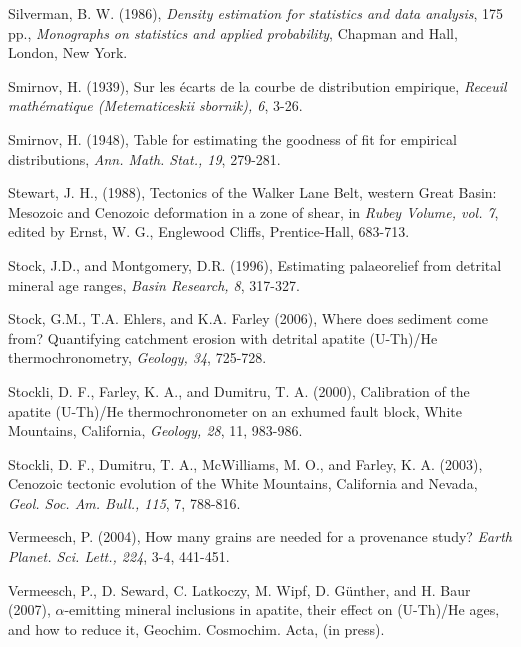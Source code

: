 \documentclass[12pt,twoside]{article}
\begin{document}
\begin{description}
\item Silverman, B. W.  (1986), {\it Density estimation for statistics
    and  data analysis}, 175  pp., {\it  Monographs on  statistics and
    applied probability}, Chapman and Hall, London, New York.
  
\item  Smirnov,  H.  (1939),  Sur  les  \'{e}carts  de  la  courbe  de
  distribution     empirique,     {\it    Receuil     math\'{e}matique
    (Metematiceskii sbornik), 6}, 3-26.
  
\item Smirnov, H. (1948), Table for estimating the goodness of fit for
  empirical distributions, {\it Ann.  Math.  Stat., 19}, 279-281.
  
\item  Stewart, J.  H., (1988),  Tectonics  of the  Walker Lane  Belt,
  western Great Basin: Mesozoic and  Cenozoic deformation in a zone of
  shear,  in {\it Rubey  Volume, vol.   7}, edited  by Ernst,  W.  G.,
  Englewood Cliffs, Prentice-Hall, 683-713.
  
\item   Stock,   J.D.,  and   Montgomery,   D.R.  (1996),   Estimating
  palaeorelief from detrital mineral  age ranges, {\it Basin Research,
    8}, 317-327.
  
\item Stock,  G.M., T.A.  Ehlers, and K.A.  Farley (2006),  Where does
  sediment  come from?   Quantifying catchment  erosion  with detrital
  apatite (U-Th)/He thermochronometry, {\it Geology, 34}, 725-728.
  
\item Stockli,  D.  F.,  Farley, K.  A.,  and Dumitru, T.  A.  (2000),
  Calibration of the apatite (U-Th)/He thermochronometer on an exhumed
  fault  block, White  Mountains, California,  {\it Geology,  28}, 11,
  983-986.
  
\item Stockli, D.  F., Dumitru,  T. A., McWilliams, M. O., and Farley,
  K.  A.  (2003), Cenozoic  tectonic evolution of the White Mountains,
  California and Nevada, {\it Geol. Soc. Am. Bull., 115}, 7, 788-816.
  
\item  Vermeesch,  P.   (2004),  How  many grains  are  needed  for  a
  provenance  study?   {\it  Earth  Planet.  Sci.  Lett.,  224},  3-4,
  441-451.
  
\item  Vermeesch,  P.,  D.   Seward,   C.   Latkoczy,  M.   Wipf,  D.  
  G\"{u}nther,   and  H.    Baur  (2007),   $\alpha$-emitting  mineral
  inclusions in  apatite, their effect  on (U-Th)/He ages, and  how to
  reduce it, Geochim. Cosmochim. Acta, (in press).

\end{description}
\end{document}
